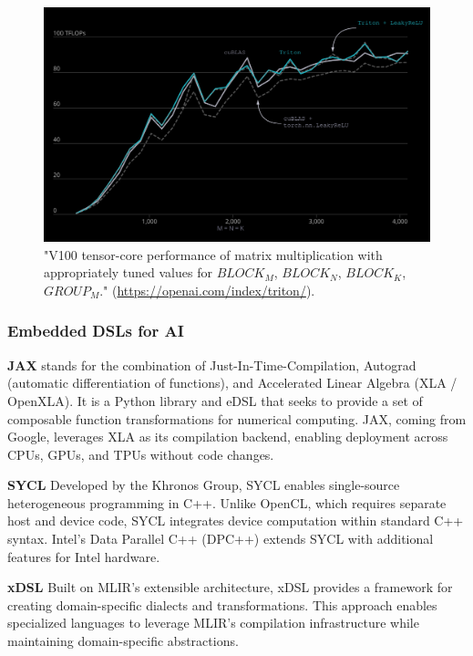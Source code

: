 \documentclass[manuscript,screen,review,format=acmsmall]{acmart}
\begin{document}
\begin{figure}[h]
  \centering
  \includegraphics[width=\linewidth]{figures/tritonperformance.png}
  \caption{"V100 tensor-core performance of matrix multiplication with appropriately tuned values for $BLOCK_M$, $BLOCK_N$, 
  $BLOCK_K$, $GROUP_M$." (\url{https://openai.com/index/triton/}).}
\end{figure}

\subsubsection{Embedded DSLs for AI}


\textbf{JAX} stands for the combination of Just-In-Time-Compilation, Autograd (automatic differentiation of functions), and Accelerated Linear Algebra (XLA / OpenXLA). It is a Python library and eDSL that seeks to provide a set of composable function transformations for numerical computing. JAX, coming from Google, leverages XLA as its compilation backend, enabling deployment across CPUs, GPUs, and TPUs without code changes.

\textbf{SYCL} Developed by the Khronos Group, SYCL enables single-source heterogeneous programming in C++. Unlike OpenCL, which requires separate host and device code, SYCL integrates device computation within standard C++ syntax. Intel's Data Parallel C++ (DPC++) extends SYCL with additional features for Intel hardware.

\textbf{xDSL} Built on MLIR's extensible architecture, xDSL provides a framework for creating domain-specific dialects and transformations. This approach enables specialized languages to leverage MLIR's compilation infrastructure while maintaining domain-specific abstractions.
\end{document}
